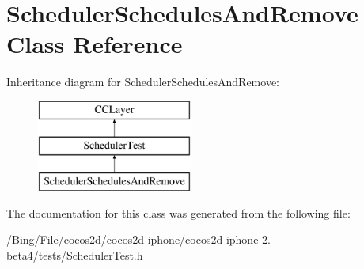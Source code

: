 \hypertarget{interface_scheduler_schedules_and_remove}{\section{Scheduler\-Schedules\-And\-Remove Class Reference}
\label{interface_scheduler_schedules_and_remove}
}
Inheritance diagram for Scheduler\-Schedules\-And\-Remove\-:\begin{figure}[H]
\begin{center}
\leavevmode
\includegraphics[height=3.000000cm]{interface_scheduler_schedules_and_remove}
\end{center}
\end{figure}


The documentation for this class was generated from the following file\-:\begin{DoxyCompactItemize}
\item 
/\-Bing/\-File/cocos2d/cocos2d-\/iphone/cocos2d-\/iphone-\/2.-\/beta4/tests/Scheduler\-Test.\-h\end{DoxyCompactItemize}
